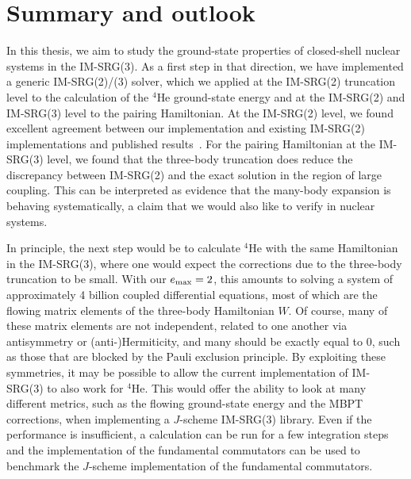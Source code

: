 \chapter{Summary and outlook}\label{ch:summary}

In this thesis, we aim to study the ground-state properties of closed-shell nuclear systems in the IM-SRG(3).
As a first step in that direction, we have implemented a generic IM-SRG(2)/(3) solver,
which we applied at the IM-SRG(2) truncation level to the calculation of the ${}^4\text{He}$ ground-state energy
and at the IM-SRG(2) and IM-SRG(3) level to the pairing Hamiltonian.
At the IM-SRG(2) level, we found excellent agreement between our implementation
and existing IM-SRG(2) implementations and published results~\cite{Stro15imsrgcpp,Herg16imsrglecnotes}.
For the pairing Hamiltonian at the IM-SRG(3) level,
we found that the three-body truncation does reduce the discrepancy between IM-SRG(2) and the exact solution
in the region of large coupling.
This can be interpreted as evidence that the many-body expansion is behaving systematically,
a claim that we would also like to verify in nuclear systems.

In principle, the next step would be to calculate ${}^4\text{He}$
with the same Hamiltonian in the IM-SRG(3),
where one would expect the corrections due to the three-body truncation to be small.
With our $e_{\text{max}}=2$, this amounts to solving a system of approximately 4 billion coupled differential equations,
most of which are the flowing matrix elements of the three-body Hamiltonian $W$.
Of course, many of these matrix elements are not independent,
related to one another via antisymmetry or (anti-)Hermiticity,
and many should be exactly equal to 0,
such as those that are blocked by the Pauli exclusion principle.
By exploiting these symmetries, it may be possible to allow the current implementation
of IM-SRG(3) to also work for ${}^4\text{He}$.
This would offer the ability to look at many different metrics,
such as the flowing ground-state energy and the MBPT corrections,
when implementing a $J$-scheme IM-SRG(3) library.
Even if the performance is insufficient, a calculation can be run for a few integration steps
and the implementation of the fundamental commutators can be used
to benchmark the $J$-scheme implementation of the fundamental commutators.

